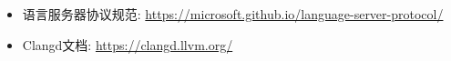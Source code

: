 \begin{itemize}
\item
语言服务器协议规范: \url{https://microsoft.github.io/language-server-protocol/}

\item
Clangd文档: \url{https://clangd.llvm.org/}
\end{itemize}